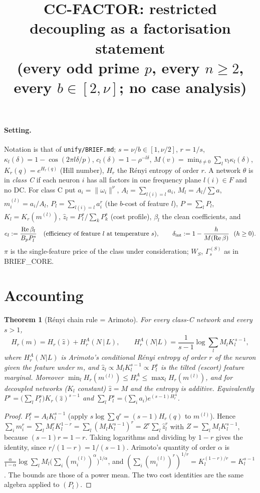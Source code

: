 \documentclass[11pt]{article}
\title{CC-FACTOR: restricted decoupling as a factorisation statement\\
\small (every odd prime $p$, every $n\ge2$, every $b\in[2,\nu]$; no case analysis)}
\date{}
\newtheorem{theorem}{Theorem}
\theoremstyle{definition}
\newcommand{\Re}{\operatorname{Re}}
\begin{document}
\maketitle

\paragraph{Setting.} Notation is that of \texttt{unify/BRIEF.md}; $s=\nu/b\in[1,\nu/2]$, $r=1/s$,
$\kappa_l(\delta)=1-\cos(2\pi l\delta/p)$, $c_l(\delta)=1-\rho^{-l\delta}$, $M(v)=\min_{\delta\ne0}\sum_l v_l\kappa_l(\delta)$,
$K_r(q)=e^{H_r(q)}$ (Hill number), $H_r$ the R\'enyi entropy of order $r$.
A network $\theta$ is in \emph{class C} if each neuron $i$ has all factors in one frequency plane $l(i)\in F$ and no DC.
For class C put $a_i=\|\omega_i\|^\nu$, $A_l=\sum_{l(i)=l}a_i$, $M_l=A_l/\sum a$, $m^{(l)}_i=a_i/A_l$,
$P_l=\sum_{l(i)=l}a_i^{r}$ (the $b$-cost of feature $l$), $P=\sum_lP_l$, $K_l=K_r(m^{(l)})$,
$\hat z_l=P_l^s/\sum_kP_k^s$ (cost profile), $\beta_l$ the clean coefficients, and
\[
 e_l:=\frac{\Re\beta_l}{B_pP_l^s}\quad\text{(efficiency of feature $l$ at temperature $s$)},\qquad
 \delta_{\rm int}:=1-\frac{h}{M(\Re\beta)}\ \ (h\ge0).
\]
$\pi$ is the single-feature price of the class under consideration; $W_S$, $\Gamma^{(S)}_s$ as in BRIEF\_CORE.

\section{Accounting}

\begin{theorem}[R\'enyi chain rule = Arimoto]\label{thm:chain}
For every class-C network and every $s>1$,
\[
H_r(m)=H_r(\hat z)+H^{A}_r(N\,|\,L),\qquad H^A_r(N|L)=\frac1{s-1}\log\sum_lM_lK_l^{\,s-1},
\]
where $H^A_r(N|L)$ is Arimoto's conditional R\'enyi entropy of order $r$ of the neuron given the feature under $m$, and
$\hat z_l\propto M_lK_l^{s-1}\propto P_l^s$ is the tilted (escort) feature marginal. Moreover
$\min_lH_r(m^{(l)})\le H^A_r\le\max_lH_r(m^{(l)})$, and for decoupled networks ($K_l$ constant) $\hat z=M$ and
the entropy is additive. Equivalently $P^s=\big(\sum_lP_l^s\big)K_r(\hat z)^{s-1}$ and $\sum_lP_l^s=\big(\sum_ia_i\big)e^{(s-1)H^A_r}$.
\end{theorem}
\begin{proof}
$P_l^s=A_lK_l^{s-1}$ (apply $s\log\sum q^r=(s-1)H_r(q)$ to $m^{(l)}$). Hence $\sum_im_i^r=\sum_lM_l^rK_l^{1-r}
=\sum_l(M_lK_l^{s-1})^r=Z^r\sum_l\hat z_l^r$ with $Z=\sum_lM_lK_l^{s-1}$, because $(s-1)r=1-r$. Taking logarithms and
dividing by $1-r$ gives the identity, since $r/(1-r)=1/(s-1)$. Arimoto's quantity of order $\alpha$ is
$\frac{\alpha}{1-\alpha}\log\sum_lM_l\big(\sum_i(m^{(l)}_i)^\alpha\big)^{1/\alpha}$, and $(\sum_i(m^{(l)}_i)^r)^{1/r}=K_l^{(1-r)/r}=K_l^{s-1}$.
The bounds are those of a power mean. The two cost identities are the same algebra applied to $(P_l)$.
\end{proof}
\end{document}
